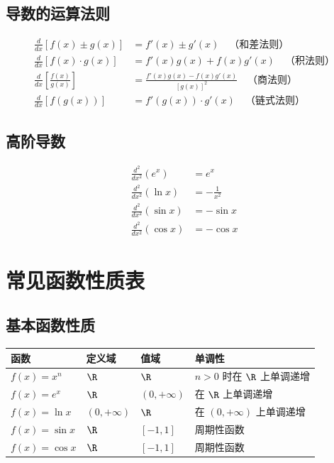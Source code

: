 \documentclass[a4paper,11pt]{ctexrep}
\theoremstyle{definition}
\begin{document}
\subsection{导数的运算法则}

\begin{methodbox}[导数的运算法则]
\begin{align}
\frac{d}{dx}[f(x) \pm g(x)] &= f'(x) \pm g'(x) \quad \text{（和差法则）} \\
\frac{d}{dx}[f(x) \cdot g(x)] &= f'(x)g(x) + f(x)g'(x) \quad \text{（积法则）} \\
\frac{d}{dx}\left[\frac{f(x)}{g(x)}\right] &= \frac{f'(x)g(x) - f(x)g'(x)}{[g(x)]^2} \quad \text{（商法则）} \\
\frac{d}{dx}[f(g(x))] &= f'(g(x)) \cdot g'(x) \quad \text{（链式法则）}
\end{align}
\end{methodbox}

\subsection{高阶导数}

\begin{tipbox}[高阶导数公式]
\begin{align}
\frac{d^2}{dx^2}(e^x) &= e^x \\
\frac{d^2}{dx^2}(\ln x) &= -\frac{1}{x^2} \\
\frac{d^2}{dx^2}(\sin x) &= -\sin x \\
\frac{d^2}{dx^2}(\cos x) &= -\cos x
\end{align}
\end{tipbox}

\section{常见函数性质表}

\subsection{基本函数性质}

\begin{definitionbox}[基本函数性质表]
\begin{tabularx}{\textwidth}{|l|X|X|X|}
\hline
\textbf{函数} & \textbf{定义域} & \textbf{值域} & \textbf{单调性} \\
\hline
$f(x) = x^n$ & $\R$ & $\R$ & $n > 0$ 时在 $\R$ 上单调递增 \\
\hline
$f(x) = e^x$ & $\R$ & $(0, +\infty)$ & 在 $\R$ 上单调递增 \\
\hline
$f(x) = \ln x$ & $(0, +\infty)$ & $\R$ & 在 $(0, +\infty)$ 上单调递增 \\
\hline
$f(x) = \sin x$ & $\R$ & $[-1, 1]$ & 周期性函数 \\
\hline
$f(x) = \cos x$ & $\R$ & $[-1, 1]$ & 周期性函数 \\
\hline
\end{tabularx}
\end{definitionbox}
\end{document}
